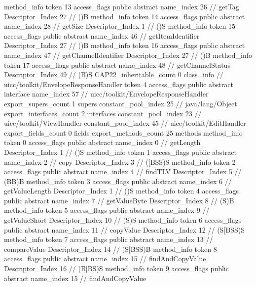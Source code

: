 {{{{{				}
				method_info {
					token	13
					access_flags	public abstract
					name_index	26		// getTag
					Descriptor_Index	27		// ()B
				}
				method_info {
					token	14
					access_flags	public abstract
					name_index	28		// getSize
					Descriptor_Index	1		// ()S
				}
				method_info {
					token	15
					access_flags	public abstract
					name_index	46		// getItemIdentifier
					Descriptor_Index	27		// ()B
				}
				method_info {
					token	16
					access_flags	public abstract
					name_index	47		// getChannelIdentifier
					Descriptor_Index	27		// ()B
				}
				method_info {
					token	17
					access_flags	public abstract
					name_index	48		// getChannelStatus
					Descriptor_Index	49		// (B)S
				}
			}
			CAP22_inheritable_count	0
		}
		class_info {		// uicc/toolkit/EnvelopeResponseHandler
			token	4
			access_flags	public abstract interface
			name_index	57		// uicc/toolkit/EnvelopeResponseHandler
			export_supers_count	1
			supers {
				constant_pool_index	25		// java/lang/Object
			}
			export_interfaces_count	2
			interfaces {
				constant_pool_index	23		// uicc/toolkit/ViewHandler
				constant_pool_index	45		// uicc/toolkit/EditHandler
			}
			export_fields_count	0
			fields {
			}
			export_methods_count	25
			methods {
				method_info {
					token	0
					access_flags	public abstract
					name_index	0		// getLength
					Descriptor_Index	1		// ()S
				}
				method_info {
					token	1
					access_flags	public abstract
					name_index	2		// copy
					Descriptor_Index	3		// ([BSS)S
				}
				method_info {
					token	2
					access_flags	public abstract
					name_index	4		// findTLV
					Descriptor_Index	5		// (BB)B
				}
				method_info {
					token	3
					access_flags	public abstract
					name_index	6		// getValueLength
					Descriptor_Index	1		// ()S
				}
				method_info {
					token	4
					access_flags	public abstract
					name_index	7		// getValueByte
					Descriptor_Index	8		// (S)B
				}
				method_info {
					token	5
					access_flags	public abstract
					name_index	9		// getValueShort
					Descriptor_Index	10		// (S)S
				}
				method_info {
					token	6
					access_flags	public abstract
					name_index	11		// copyValue
					Descriptor_Index	12		// (S[BSS)S
				}
				method_info {
					token	7
					access_flags	public abstract
					name_index	13		// compareValue
					Descriptor_Index	14		// (S[BSS)B
				}
				method_info {
					token	8
					access_flags	public abstract
					name_index	15		// findAndCopyValue
					Descriptor_Index	16		// (B[BS)S
				}
				method_info {
					token	9
					access_flags	public abstract
					name_index	15		// findAndCopyValue
}}}}}
